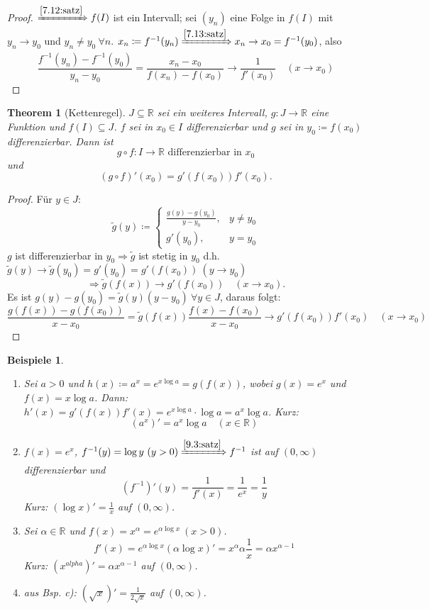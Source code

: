 \documentclass[14pt,titlepage,ngerman,a4paper,headsepline,DIV15,halfparskip*]{scrartcl}
\newcommand{\R}{\mathbb{R}}
\theoremstyle{named}
\newtheorem{namedtheorem}{Theorem} \counterwithin{namedtheorem}{section}
\theoremstyle{dotless}
\newtheorem*{beispiele}{Beispiele}
\begin{document}
\begin{proof} $\xRightarrow[]{\ref{7.12:satz}} f(I)$ ist ein Intervall; sei $(y_{n})$ eine Folge in $f(I)$ mit $y_{n} \rightarrow y_{0}$ und $y_{n} \neq y_{0} ~\forall n$. $x_{n} \coloneqq f^{-1}(y_{n}) \xRightarrow[]{\ref{7.13:satz}} x_{n} \rightarrow x_{0} = f^{-1}(y_{0})$, also
	$$ \frac{f^{-1}(y_{n}) - f^{-1}(y_{0})}{y_{n} - y_{0}} = \frac{x_{n} - x_{0}}{f(x_{n}) - f(x_{0})} \rightarrow \frac{1}{f'(x_{0})} \quad (x \rightarrow x_{0}) $$
\end{proof}

\begin{namedtheorem}[Kettenregel] \label{9.4:prop-Kettenregel}
	$J \subseteq \R$ sei ein weiteres Intervall, $g \colon J \rightarrow \R$ eine Funktion und $f(I) \subseteq J$. $f$ sei in $x_{0} \in I$ differenzierbar und $g$ sei in $y_{0} \coloneqq f(x_{0})$ differenzierbar. Dann ist
		$$ g \circ f \colon I \rightarrow \R \text{ differenzierbar in } x_{0} $$
		und
		$$ (g \circ f)'(x_{0}) = g'(f(x_{0})) f'(x_{0}). $$
\end{namedtheorem}

\begin{proof}
	Für $y \in J$:
		$$ \tilde{g}(y) \coloneqq \begin{cases} \frac{g(y) - g(y_{0})}{y - y_{0}}, & y \neq y_{0} \\ g'(y_{0}), & y = y_{0} \end{cases} $$
	$g$ ist differenzierbar in $y_{0} \Rightarrow \tilde{g}$ ist stetig in $y_{0}$ d.h. $\tilde{g}(y) \rightarrow \tilde{g}(y_{0}) = g'(y_{0}) = g'(f(x_{0})) ~(y \rightarrow y_{0})$
		$$ \Rightarrow \tilde{g}(f(x)) \rightarrow g'(f(x_{0})) \quad (x \rightarrow x_{0}). $$
	Es ist $g(y) - g(y_{0}) = \tilde{g}(y) (y - y_{0}) ~\forall y \in J$, daraus folgt:
		$$ \frac{g(f(x)) - g(f(x_{0}))}{x - x_{0}} = \tilde{g}(f(x)) \frac{f(x) - f(x_{0})}{x - x_{0}} \rightarrow g'(f(x_{0})) f'(x_{0}) \quad (x \rightarrow x_{0}) $$
\end{proof}


\begin{beispiele} ~\
	\begin{enumerate}
		\item Sei $a > 0$ und $h(x) \coloneqq a^{x} = e^{x \log a} = g(f(x))$, wobei $g(x) = e^{x}$ und $f(x) = x \log a$. Dann: $h'(x) = g'(f(x)) f'(x) = e^{x \log a} \cdot \log a = a^{x} \log a$. Kurz:
			$$ (a^{x})' = a^{x} \log a \quad (x \in \R) $$
		\item $f(x) = e^{x}$, $f^{-1}(y) = \log y ~(y > 0) \xRightarrow[]{\ref{9.3:satz}} f^{-1}$ ist auf $(0, \infty)$ differenzierbar und
			$$ (f^{-1})'(y) = \frac{1}{f'(x)} = \frac{1}{e^{x}} = \frac{1}{y} $$
			Kurz: $(\log x)' = \frac{1}{x}$ auf $(0, \infty)$.
		\item Sei $\alpha \in \R$ und $f(x) = x^{\alpha} = e^{\alpha \log x} ~(x > 0)$.
			$$ f'(x) = e^{\alpha \log x} (\alpha \log x)' = x^{\alpha} \alpha \frac{1}{x} = \alpha x^{\alpha - 1} $$
			Kurz: $(x^{alpha})' = \alpha x^{\alpha - 1}$ auf $(0, \infty)$.
		\item aus Bsp. c): $(\sqrt{x})' = \frac{1}{2 \sqrt{x}}$ auf $(0, \infty)$.
	\end{enumerate}
\end{beispiele}
\end{document}
